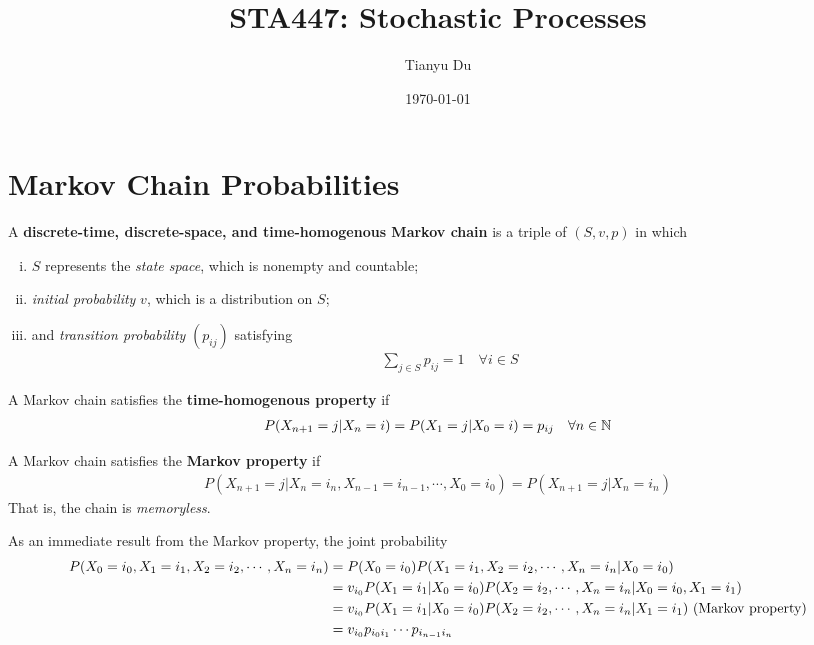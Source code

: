 \documentclass{article}
\title{STA447: Stochastic Processes}
\date{\today}
\author{Tianyu Du}
\begin{document}
    \maketitle
    \tableofcontents
    \newpage
    \section{Markov Chain Probabilities}
    
    \begin{definition}
    	A \textbf{discrete-time, discrete-space, and time-homogenous Markov chain} is a triple of $(S, v, p)$ in which
    	\begin{enumerate}[(i)]
    		\item $S$ represents the \emph{state space}, which is nonempty and countable;
    		\item \emph{initial probability} $v$, which is a distribution on $S$;
    		\item and \emph{transition probability} $(p_{ij})$ satisfying
    		\begin{align}
    			\sum_{j \in S} p_{ij} = 1\quad \forall i \in S
    		\end{align}
    	\end{enumerate}
    \end{definition}
    
    \begin{definition}
    	A Markov chain satisfies the \textbf{time-homogenous property} if
    	\begin{align}
    		P(X_{n+1}=j|X_n=i) = P(X_1=j|X_0=i) = p_{ij}\quad \forall n \in \mathbb{N}
    	\end{align}
    \end{definition}
    
    \begin{definition}
    	A Markov chain satisfies the \textbf{Markov property} if
    	\begin{align}
    		P(X_{n+1}=j|X_n=i_n, X_{n-1}=i_{n-1}, \cdots, X_0=i_0) = P(X_{n+1}=j|X_n=i_n)
    	\end{align}
    	That is, the chain is \emph{memoryless}.
    \end{definition}
    
    \begin{proposition}
    	As an immediate result from the Markov property, the joint probability
    	\begin{align}
    		P(X_0=i_0, X_1=i_1, X_2=i_2, \cdots, X_n=i_n)
    		&= P(X_0=i_0) P(X_1=i_1, X_2=i_2, \cdots, X_n=i_n|X_0=i_0) \\
    		&= v_{i_0} P(X_1=i_1|X_0=i_0) P(X_2=i_2, \cdots, X_n=i_n|X_0=i_0, X_1=i_1) \\
    		&= v_{i_0} P(X_1=i_1|X_0=i_0) P(X_2=i_2, \cdots, X_n=i_n|X_1=i_1) \text{{ (Markov property)}}\\
    		&= v_{i_0} p_{i_0 i_1} \cdots p_{i_{n-1}i_n}
    	\end{align}
    \end{proposition}
    
\end{document}
